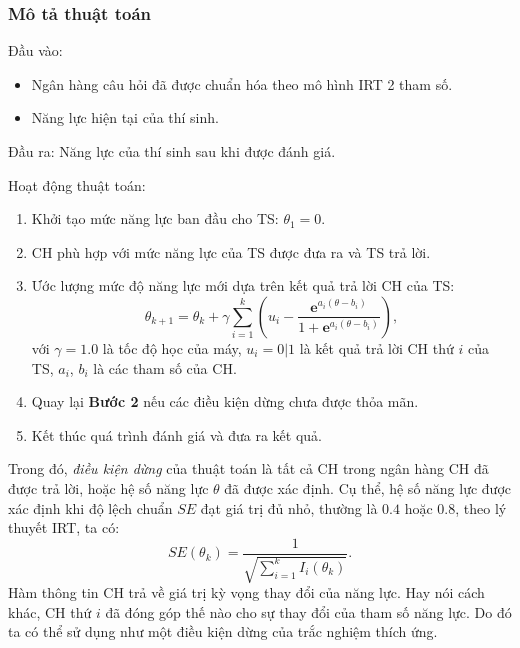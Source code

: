\subsubsection{Mô tả thuật toán}

\noindent Đầu vào:\par
\begin{itemize}
	\item Ngân hàng câu hỏi đã được chuẩn hóa theo mô hình IRT 2 tham số.
	\item Năng lực hiện tại của thí sinh.
\end{itemize}\par
\noindent Đầu ra: Năng lực của thí sinh sau khi được đánh giá.\par
\noindent Hoạt động thuật toán:\par
\begin{enumerate}[label=\textbf{Bước \arabic*.},align=left,left=0cm..0cm,itemindent=*]
	\item Khởi tạo mức năng lực ban đầu cho TS: $\theta_1=0$.
	\item CH phù hợp với mức năng lực của TS được đưa ra và TS trả lời.
	\item Ước lượng mức độ năng lực mới dựa trên kết quả trả lời CH của TS:
	\begin{equation}\label{eqn:eqn-s2-new-theta}
		\theta_{k+1}=\theta_k+\gamma\sum_{i=1}^{k}\left(u_i-\frac{\mathbf{e}^{a_i(\theta-b_i)}}{1+\mathbf{e}^{a_i(\theta-b_i)}}\right),
	\end{equation}
	với $\gamma=1.0$ là tốc độ học của máy, $u_i=0|1$ là kết quả trả lời CH thứ $i$ của TS, $a_i$, $b_i$ là các tham số của CH.
	\item Quay lại \textbf{Bước 2} nếu các điều kiện dừng chưa được thỏa mãn.
	\item Kết thúc quá trình đánh giá và đưa ra kết quả.
\end{enumerate}\par
Trong đó, \textit{điều kiện dừng} của thuật toán là tất cả CH trong ngân hàng CH đã được trả lời, hoặc hệ số năng lực $\theta$ đã được xác định. Cụ thể, hệ số năng lực được xác định khi độ lệch chuẩn $SE$ đạt giá trị đủ nhỏ, thường là $0.4$ hoặc $0.8$, theo lý thuyết IRT, ta có:
\begin{equation}\label{eqn:eqn-s2-se-theta}
	SE(\theta_k)=\frac{1}{\sqrt{\sum_{i=1}^{k}I_i(\theta_k)}}.
\end{equation}
Hàm thông tin CH trả về giá trị kỳ vọng thay đổi của năng lực. Hay nói cách khác, CH thứ $i$ đã đóng góp thế nào cho sự thay đổi của tham số năng lực. Do đó ta có thể sử dụng như một điều kiện dừng của trắc nghiệm thích ứng.\par

